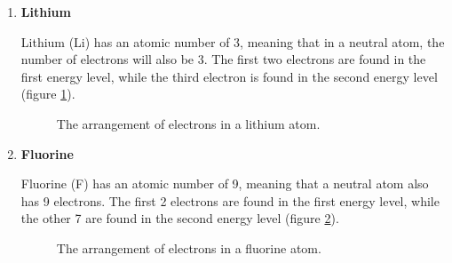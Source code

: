 \begin{enumerate}[noitemsep, label=\textbf{\arabic*}. ] 

\item{\textbf{Lithium} \\
\begin{minipage}{.4\textwidth}
Lithium (Li) has an atomic number of 3, meaning that in a neutral atom, the number of electrons will also be 3. The first two electrons are found in the first energy level, while the third electron is found in the second energy level (figure \ref{fig:atom:lithium}).
\end{minipage}
\begin{minipage}{.6\textwidth}
\begin{figure}[H]
\begin{center}
\caption{The arrangement of electrons in a lithium atom.}
\label{fig:atom:lithium}
\end{center}
\end{figure}
\end{minipage}
}

\item{\textbf{Fluorine} \\
\begin{minipage}{.4\textwidth}
Fluorine (F) has an atomic number of 9, meaning that a neutral atom also has 9 electrons. The first 2 electrons are found in the first energy level, while the other 7 are found in the second energy level (figure \ref{fig:atom:fluorine}).
\end{minipage}
\begin{minipage}{.6\textwidth}
\begin{figure}[H]
\begin{center}
\caption{The arrangement of electrons in a fluorine atom.}
\label{fig:atom:fluorine}
\end{center}
\end{figure}
\end{minipage}
}


\end{enumerate}
